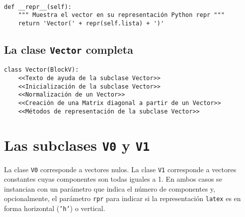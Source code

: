 \documentclass[11pt]{report}
\begin{document}
\begin{verbatim}

def __repr__(self):
    """ Muestra el vector en su representación Python repr """
    return 'Vector(' + repr(self.lista) + ')'

\end{verbatim}
\section{La clase \texttt{Vector} completa}
\label{sec:org835e0a6}

\begin{verbatim}
class Vector(BlockV):
    <<Texto de ayuda de la subclase Vector>>
    <<Inicialización de la subclase Vector>>
    <<Normalización de un Vector>>
    <<Creación de una Matrix diagonal a partir de un Vector>>
    <<Métodos de representación de la subclase Vector>>
\end{verbatim}


\chapter{Las subclases \texttt{V0} y \texttt{V1}}
\label{sec:org5cc00c5}

La clase \texttt{V0} corresponde a vectores nulos. La clase \texttt{V1} corresponde
a vectores constantes cuyas componentes son todas iguales a 1. En
ambos casos se instancian con un parámetro que indica el número de
componentes y, opcionalmente, el parámetro \texttt{rpr} para indicar si la
representación \texttt{latex} es en forma horizontal (\texttt{'h'}) o vertical.
\end{document}
